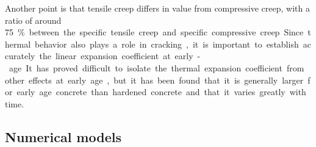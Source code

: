 \documentclass{report}
\begin{document}
Another point is that tensile creep differs in value from compressive creep,
with a ratio of around \SI{75}\percent between the specific tensile creep and
specific compressive creep.

Since thermal behavior also plays a role in cracking, it is important to
establish accurately the linear expansion coefficient at early-age. It has
proved difficult to isolate the thermal expansion coefficient from other
effects at early age, but it has been found that it is generally larger for
early age concrete than hardened concrete and that it varies greatly with time.

\subsection{Numerical models}

\printbibliography
\end{document}
